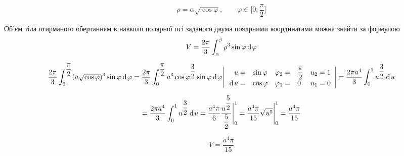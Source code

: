 {}

$$
\rho = \alpha \sqrt{\cos{\varphi}},{\qquad} \varphi \in \Big[ 0; \dfrac{\pi}{2} \Big]
$$

Об'єм  тіла  отирманого обертанням в навколо полярної осі заданого двума поялрними координатами можна знайти за формулою
$$
V = \dfrac{2\pi}{3} \int_{\alpha}^{\beta} \rho^3\sin{\varphi} \hspace{2pt}\text{d}\hspace{1pt}{\varphi}
$$

$$
\dfrac{2\pi}{3} \int_0^{\dfrac{\pi}{2}} (a\sqrt{\cos{\varphi}})^3\sin{\varphi} \hspace{2pt}\text{d}\hspace{1pt}{\varphi}
= \dfrac{2\pi}{3} \int_0^{\dfrac{\pi}{2}} a^3 \cos{\varphi}^{\dfrac{3}{2}}  \sin{\varphi} \hspace{2pt}\text{d}\hspace{1pt}{\varphi}
\Bigg|
  \begin{array}{rl rl r}
     u =& \sin{\varphi} & \varphi_2 = & \dfrac{\pi}{2} & u_2 =   1  \\
    \hspace{2pt}\text{d}\hspace{1pt}{u} =& \cos{\varphi} & \varphi_1 = & 0 & u_1 =   0 \\
  \end{array}
\Bigg| = \dfrac{2\pi a^4 }{3} \int^1_0 u^{\dfrac{3}{2}}\hspace{2pt}\text{d}\hspace{1pt}{u}
$$

$$
= \dfrac{2\pi a^4 }{3} \int^1_0 u^{\dfrac{3}{2}}\hspace{2pt}\text{d}\hspace{1pt}{u}
= \dfrac{a^4 \pi}{6} \dfrac{u^{\dfrac{5}{2}}}{\dfrac{5}{2}} \Bigg|_0^{1}
= \dfrac{a^4 \pi}{15} \sqrt{u^5} \Bigg|_0^{1}
= \dfrac{a^4 \pi}{15}
$$

$$
\boxed{V = \dfrac{a^4 \pi}{15} }
$$

